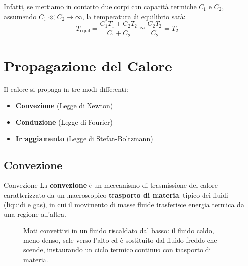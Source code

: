 \medskip
Infatti, se mettiamo in contatto due corpi con capacità termiche $C_1$ e $C_2$, assumendo $C_1 \ll C_2 \to \infty$, la temperatura di equilibrio sarà:
\begin{equation}
T_{\text{equil}} = \frac{C_1 T_1 + C_2 T_2}{C_1 + C_2} \simeq \frac{C_2 T_2}{C_2} = T_2
\end{equation}

\section{Propagazione del Calore}
Il calore si propaga in tre modi differenti:
\begin{itemize}
    \item \textbf{Convezione} (Legge di Newton)
    \item \textbf{Conduzione} (Legge di Fourier)
    \item \textbf{Irraggiamento} (Legge di Stefan-Boltzmann)
\end{itemize}

\subsection{Convezione}
\begin{definizione}{Convezione}
La \textbf{convezione} è un meccanismo di trasmissione del calore caratterizzato da un macroscopico \textbf{trasporto di materia}, tipico dei fluidi (liquidi e gas), in cui il movimento di masse fluide trasferisce energia termica da una regione all'altra.
\end{definizione}

\begin{figure}[ht]
\centering
{}
\caption{Moti convettivi in un fluido riscaldato dal basso: il fluido caldo, meno denso, sale verso l'alto ed è sostituito dal fluido freddo che scende, instaurando un ciclo termico continuo con trasporto di materia.}
\end{figure}

